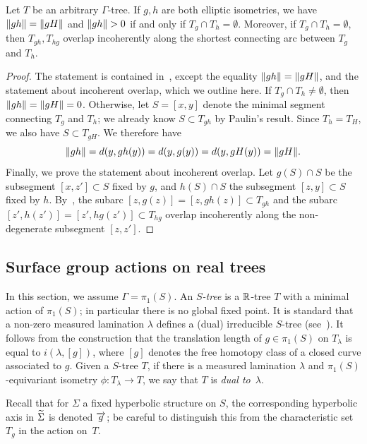\begin{lemma}
  Let $T$ be an arbitrary $\Gamma$-tree. If $g,h$ are both elliptic
  isometries, we have $\lVert gh\rVert = \lVert gH\rVert$ and $\lVert gh\rVert>0$ if and only if
  $T_g \cap T_h = \emptyset$. Moreover, if $T_g \cap T_h = \emptyset$,
 then $T_{gh}, T_{hg}$ overlap incoherently  along the shortest connecting arc between $T_g$ and $T_h$.
\label{lem:pau_two_ell}
\end{lemma}
\begin{proof}
The statement is contained
in~\cite[Proposition~1.8]{Pa89:Paulin1989TheGT}, except the equality
$\lVert gh\rVert=\lVert gH\rVert$, and the statement about incoherent overlap, which we outline here. If $T_g \cap T_h \neq
\emptyset$, then $\lVert gh\rVert=\lVert gH\rVert=0$. Otherwise, let $S=[x,y]$ denote
the minimal segment connecting $T_g$ and $T_h$; we already know $S
\subset T_{gh}$ by Paulin's result. Since $T_h = T_H$, we also have $S
\subset T_{gH}$. We therefore have
\[
  \lVert gh\rVert = d(y,gh(y)) = d(y, g(y)) = d(y, gH(y)) = \lVert gH\rVert.
\]
Finally, we prove the statement about incoherent overlap. Let $g(S) \cap S$ be the subsegment $[x,z'] \subset S$ fixed by $g$, and $h(S) \cap S$ the subsegment $[z,y]\subset S$ fixed by $h$. By~\cite[Figure~9]{Pa89:Paulin1989TheGT}, the subarc $[z,g(z)]=[z,gh(z)] \subset T_{gh}$ and the subarc $[z',h(z')]=[z',hg(z')] \subset T_{hg}$ overlap incoherently along the non-degenerate subsegment $[z,z']$.
\end{proof}


\subsection{Surface group actions on real trees}

In this section, we assume $\Gamma = \pi_1(S)$. An \emph{$S$-tree} is
a $\mathbb{R}$-tree $T$ with a minimal action of $\pi_1(S)$; in particular
there is no global fixed point.
It is standard that a non-zero measured lamination $\lambda$ defines a
(dual) irreducible $S$-tree (see~\cite{MO84:Valuations}).
It follows from the construction that the translation length of
$g \in\pi_1(S)$  on
$T_\lambda$ is equal to
$i(\lambda,[g])$, where $[g]$ denotes the free homotopy class of a
closed curve associated to $g$.
Given a $S$-tree $T$, if there is a measured lamination $\lambda$ and $\pi_1(S)$-equivariant isometry $\phi \colon T_\lambda \to T$, we say that $T$ is \emph{dual to}~$\lambda$.

Recall that for $\Sigma$ a fixed hyperbolic structure on $S$, the
corresponding hyperbolic axis in $\widetilde{\Sigma}$ is denoted $\overrightarrow{g}$;
be careful to distinguish this from the characteristic set $T_g$ in
the action on~$T$.

